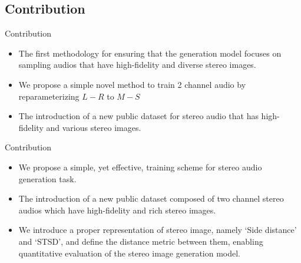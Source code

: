 \subsection{Contribution}
\begin{frame}{Contribution}
    \begin{itemize}
        \item The first methodology for ensuring that the generation model focuses on sampling audios that have high-fidelity and diverse stereo images.
        \bigskip
        \item We propose a simple novel method to train 2 channel audio by reparameterizing $L-R$ to $M-S$
        \bigskip
        \item The introduction of a new public dataset for stereo audio that has high-fidelity and various stereo images.
    \end{itemize}
\end{frame}
\fi
\begin{frame}{Contribution}
    \begin{itemize}
        \item We propose a simple, yet effective, training scheme for stereo audio generation task.
        \bigskip
        \item The introduction of a new public dataset composed of two channel stereo audios which have high-fidelity and rich stereo images.
        \bigskip
        \item We introduce a proper representation of stereo image, namely `Side distance' and `STSD', and define the distance metric between them, enabling quantitative evaluation of the stereo image generation model.
    \end{itemize}
\end{frame}